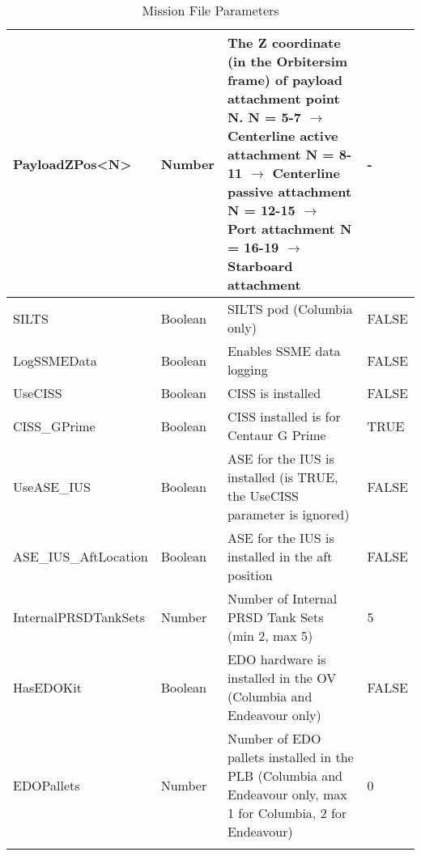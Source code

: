 \documentclass[Space_Shuttle_Ultra_Manual.tex]{subfiles}
\begin{document}
\begin{longtable}{|l|p{1.5cm}|p{7.5cm}|p{2.0cm}|}
	\hline
	\rule{0pt}{2ex}
	PayloadZPos<N> & Number & The Z coordinate (in the Orbitersim frame) of payload attachment point N.\newline
N = 5-7 $\rightarrow$ Centerline active attachment\newline
N = 8-11 $\rightarrow$ Centerline passive attachment\newline
N = 12-15 $\rightarrow$ Port attachment\newline
N = 16-19 $\rightarrow$ Starboard attachment & - \\
	\hline
	\rule{0pt}{2ex}
	SILTS & Boolean & SILTS pod (Columbia only) & FALSE\\
	\hline
	\rule{0pt}{2ex}
	LogSSMEData & Boolean & Enables SSME data logging & FALSE\\
	\hline
	\rule{0pt}{2ex}
	UseCISS & Boolean & CISS is installed & FALSE\\
	\hline
	\rule{0pt}{2ex}
	CISS\_GPrime & Boolean & CISS installed is for Centaur G Prime & TRUE\\
	\hline
	\rule{0pt}{2ex}
	UseASE\_IUS & Boolean & ASE for the IUS is installed (is TRUE, the UseCISS parameter is ignored) & FALSE\\
	\hline
	\rule{0pt}{2ex}
	ASE\_IUS\_AftLocation & Boolean & ASE for the IUS is installed in the aft position & FALSE\\
	\hline
	\rule{0pt}{2ex}
	InternalPRSDTankSets & Number & Number of Internal PRSD Tank Sets (min 2, max 5) & 5\\
	\hline
	\rule{0pt}{2ex}
	HasEDOKit & Boolean & EDO hardware is installed in the OV (Columbia and Endeavour only) & FALSE\\
	\hline
	\rule{0pt}{2ex}
	EDOPallets & Number & Number of EDO pallets installed in the PLB (Columbia and Endeavour only, max 1 for Columbia, 2 for Endeavour) & 0\\
	\hline
	\caption{Mission File Parameters}
  \label{tab:Mission_File}
	\end{longtable}
\end{document}
